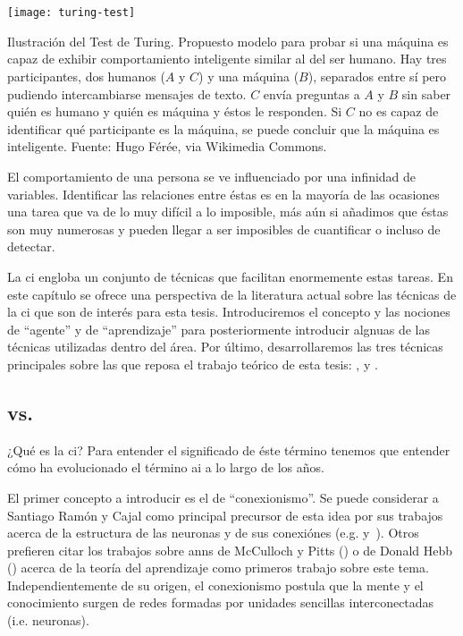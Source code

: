 \chapter{}
\label{ch:sota-ci}

\begin{marginfigure}
	\texttt{[image: turing-test]}
	\caption{Ilustración del Test de Turing. Propuesto modelo para probar si una máquina es capaz de exhibir comportamiento inteligente similar al del ser humano. Hay tres participantes, dos humanos ($A$ y $C$) y una máquina ($B$), separados entre sí pero pudiendo intercambiarse mensajes de texto. $C$ envía preguntas a $A$ y $B$ sin saber quién es humano y quién es máquina y éstos le responden. Si $C$ no es capaz de identificar qué participante es la máquina, se puede concluir que la máquina es inteligente. Fuente: Hugo Férée, via Wikimedia Commons.}
	\label{fig:turing-test}
\end{marginfigure}

El comportamiento de una persona se ve influenciado por una infinidad de variables. Identificar las relaciones entre éstas es en la mayoría de las ocasiones una tarea que va de lo muy difícil a lo imposible, más aún si añadimos que éstas son muy numerosas y pueden llegar a ser imposibles de cuantificar o incluso de detectar.

La \ac{ci} engloba un conjunto de técnicas que facilitan enormemente estas tareas. En este capítulo se ofrece una perspectiva de la literatura actual sobre las técnicas de la \gls{ci} que son de interés para esta tesis. Introduciremos el concepto y las nociones de \enquote{agente} y de \enquote{aprendizaje} para posteriormente introducir algnuas de las técnicas utilizadas dentro del área. Por último, desarrollaremos las tres técnicas principales sobre las que reposa el trabajo teórico de esta tesis: ,  y .

\section{ vs. }

¿Qué es la \ac{ci}? Para entender el significado de éste término tenemos que entender cómo ha evolucionado el término \ac{ai} a lo largo de los años.

El primer concepto a introducir es el de \enquote{conexionismo}. Se puede considerar a Santiago Ramón y Cajal como principal precursor de esta idea por sus trabajos acerca de la estructura de las neuronas y de sus conexiónes (e.g. \cite{y1888estructura} y~\cite{ramon1904textura}). Otros prefieren citar los trabajos sobre \acp{ann} de McCulloch y Pitts (\cite{McCulloch1943}) o de Donald Hebb (\cite{hebb19680}) acerca de la teoría del aprendizaje como primeros trabajo sobre este tema. Independientemente de su origen, el conexionismo postula que la mente y el conocimiento surgen de redes formadas por unidades sencillas interconectadas (i.e. neuronas).

